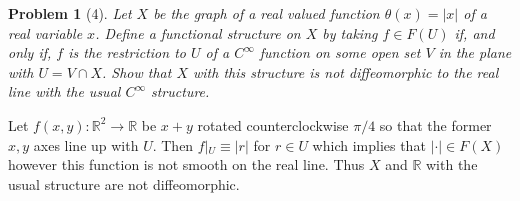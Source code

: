 \documentclass[10pt]{article}
\newcommand{\sk}{\vskip 10mm}
\newcommand{\bb}[1]{\mathbb{#1}}
\theoremstyle{plain}
\newtheorem{problem}{Problem}
\theoremstyle{remark}
\begin{document}
\sk

\begin{problem}[4]
  Let $X$ be the graph of a real valued function $\theta(x)=|x|$ of a real
  variable $x$. Define a functional structure on $X$ by taking $f\in F(U)$
  if, and only if, $f$ is the restriction to $U$ of a $C^\infty$ function on some
  open set $V$ in the plane with $U=V\cap X$. Show that $X$ with this structure
  is \textit{not} diffeomorphic to the real line with the usual $C^\infty$ structure.
\end{problem}

Let $f(x,y):\bb{R}^2\rightarrow \bb{R}$ be $x+y$ rotated counterclockwise $\pi/4$ so that the former $x,y$ axes
line up with $U$. Then $f|_U\equiv |r|$ for $r\in U$ which implies that $|\cdot|\in F(X)$ however
this function is not smooth on the real line. Thus $X$ and $\bb{R}$ with the usual
structure are not diffeomorphic.


\end{document}
